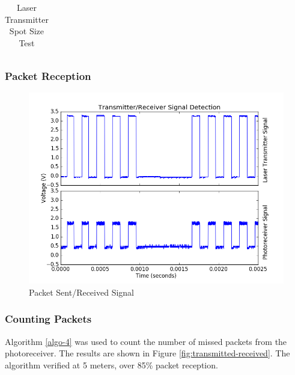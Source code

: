 \documentclass[letterpaper,10pt]{article}
\begin{document}
\begin{spacing}{1.15}
\begin{table}[htbp]
\begin{tabular}{c|c|c}
		
		\bottomrule	%
	\end{tabular}%
	\caption{Laser Transmitter Spot Size Test}
	\label{tab:distance-requirement}	%
\end{table}%

\subsubsection{Packet Reception}
\begin{figure} [H]
	\centering
	\includegraphics[scale=0.45]{packet_verification.png}
	\caption{Packet Sent/Received Signal\label{fig:packet-verification}}
\end{figure}

\subsubsection {Counting Packets}
Algorithm \ref{algo-4} was used to count the number of missed packets from the photoreceiver.
The results are shown in Figure \ref{fig:transmitted-received}. The algorithm verified at 5 meters, over 85\% packet reception.


\end{spacing}
\end{document}
